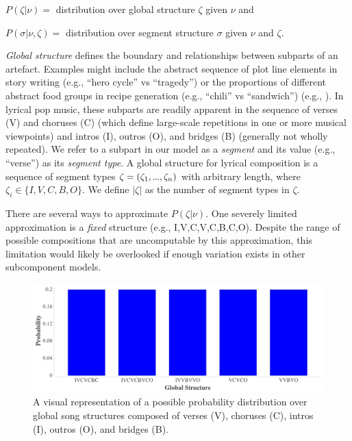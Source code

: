 \documentclass[phd,electronic,oneside,twosidetoc,letterpaper,chaptercenter,parttop,lol,lof,lot]{byumsphd}
\newcommand\mydots{\hbox to .75em{.\hss.\hss.}}
\begin{document}
\(P(\zeta|\nu)=\) distribution over global structure $\zeta$ given $\nu$ and

\(P(\sigma|\nu,\zeta)=\) distribution over segment structure $\sigma$ given $\nu$ and $\zeta$.

\emph{Global structure} defines the boundary and relationships between subparts of an artefact. Examples might include the abstract sequence of plot line elements in story writing (e.g., ``hero cycle'' vs ``tragedy'') or the proportions of different abstract food groups in recipe generation (e.g., ``chili'' vs ``sandwich'') (e.g., \cite{morris2012soup}). In lyrical pop music, these subparts are readily apparent in the sequence of verses (V) and choruses (C) (which define large-scale repetitions in one or more musical viewpoints) and intros (I), outros (O), and bridges (B) (generally not wholly repeated). We refer to a subpart in our model as a \textit{segment} and its value (e.g., ``verse'') as its \textit{segment type}. A global structure for lyrical composition is a sequence of segment types $\zeta = (\zeta_1,\mydots,\zeta_n)$ with arbitrary length, where $\zeta_i\in\{I,V,C,B,O\}$. We define $|\zeta|$ as the number of segment types in $\zeta$.

There are several ways to approximate $P(\zeta|\nu)$. One severely limited approximation is a \textit{fixed} structure (e.g., I,V,C,V,C,B,C,O). Despite the range of possible compositions that are uncomputable by this approximation, this limitation would likely be overlooked if enough variation exists in other subcomponent models.

\begin{figure}
	\centering
	\includegraphics[width=\linewidth]{global_structure}
	\caption{\label{fig:global_structure} A visual representation of a possible probability distribution over global song structures composed of verses (V), choruses (C), intros (I), outros (O), and bridges (B).}
\end{figure}
\end{document}
